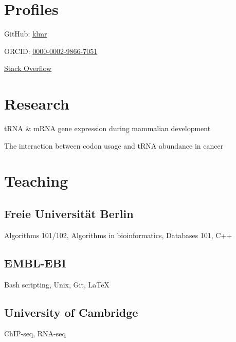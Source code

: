 \documentclass{klmr-cv}
\newcommand*\cpp{C++}
\begin{document}
\section{Profiles}

\item{GitHub: \href{http://github.com/klmr}{klmr}}
\item{ORCID: \href{http://orcid.org/0000-0002-9866-7051}{0000-0002-9866-7051}}
\item{\href{http://stackoverflow.com/users/1968/konrad-rudolph}{Stack Overflow}}

\section{Research}

\date{2011--2014}
\item{tRNA \& mRNA gene expression during mammalian development}

\date{2014--2015}
\item{The interaction between codon usage and tRNA abundance in cancer}

\section{Teaching}

\subsection{Freie Universität Berlin}

\date{2008--2011}
\item{}
\item{Algorithms 101/102, Algorithms in bioinformatics, Databases 101, \cpp}

\subsection{EMBL-EBI}

\date{2011--2014}
\item{}
\item{Bash scripting, Unix, Git, \LaTeX}

\subsection{University of Cambridge}

\date{2013--2015}
\item{}
\item{ChIP-seq, RNA-seq}
\end{document}
